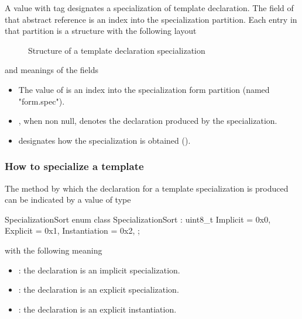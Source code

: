 A  value with tag  designates a specialization of template declaration.
The  field of that abstract reference is an index into the specialization partition.
Each entry in that partition is a structure with the following layout
%
\begin{figure}[H]
	\centering
	\caption{Structure of a template declaration specialization}
	\label{fig:ifc-specialization-declaration}
\end{figure}
%
and meanings of the fields
\begin{itemize}
	\item The value of  is an index into the specialization form partition (named "form.spec").
	\item {}, when non null, denotes the declaration produced by the specialization.
	\item {} designates how the specialization is obtained ().
\end{itemize}


\subsubsection{How to specialize a template}
\label{sec:ifc-SpecializationSort}

The method by which the declaration for a template specialization is produced can be indicated by a value of type
%
\begin{typedef}{SpecializationSort}{}
	enum class SpecializationSort : uint8_t {
		Implicit = 0x0,
		Explicit = 0x1,
		Instantiation = 0x2,
	};
\end{typedef}
%
with the following meaning
\begin{itemize}
	\item {}: the declaration is an implicit specialization.
	\item {}: the declaration is an explicit specialization.
	\item {}: the declaration is an explicit instantiation.
\end{itemize}


